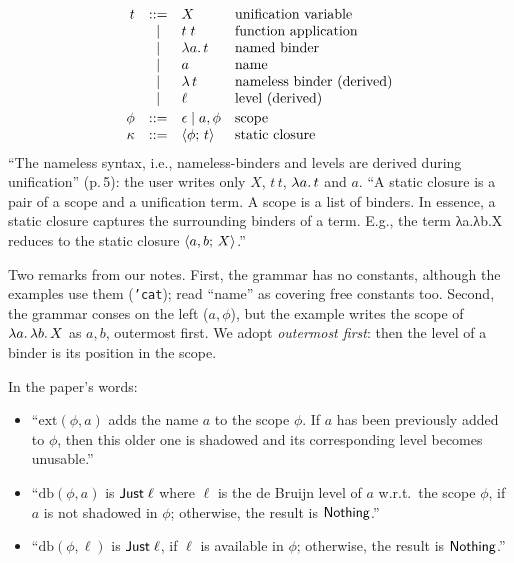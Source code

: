 \begin{definition}\label{def:lkanren-closure}
\[
\begin{array}{rcll}
t & ::= & X & \text{unification variable}\\
  & \mid & t\;t & \text{function application}\\
  & \mid & \lambda a.\,t & \text{named binder}\\
  & \mid & a & \text{name}\\
  & \mid & \lambda\,t & \text{nameless binder (derived)}\\
  & \mid & \ell & \text{level (derived)}\\[2pt]
\phi & ::= & \epsilon \mid a,\phi & \text{scope}\\
\kappa & ::= & \langle \phi;\,t\rangle & \text{static closure}
\end{array}
\]
\enquote{The nameless syntax, i.e., nameless-binders and levels are derived during unification}
(p.\,5): the user writes only $X$, $t\,t$, $\lambda a.\,t$ and $a$. \enquote{A static closure is a pair
of a scope and a unification term. A scope is a list of binders. In essence, a static closure
captures the surrounding binders of a term. E.g., the term λa.λb.X reduces to the static closure
$\langle a,b;\,X\rangle$.}
\end{definition}

Two remarks from our notes. First, the grammar has no constants, although the examples use them
(\texttt{'cat}); read \enquote{name} as covering free constants too. Second, the grammar conses on
the left ($a,\phi$), but the example writes the scope of $\lambda a.\,\lambda b.\,X$ as $a,b$, outermost
first. We adopt \emph{outermost first}: then the level of a binder is its position in the scope.

\begin{definition}\label{def:lkanren-extdb}
In the paper's words:
\begin{itemize}
  \item \enquote{$\mathrm{ext}(\phi,a)$ adds the name $a$ to the scope $\phi$. If $a$ has been
    previously added to $\phi$, then this older one is shadowed and its corresponding level becomes
    unusable.}
  \item \enquote{$\mathrm{db}(\phi,a)$ is $\mathsf{Just}\;\ell$ where $\ell$ is the de Bruijn level of $a$
    w.r.t.\ the scope $\phi$, if $a$ is not shadowed in $\phi$; otherwise, the result is
    $\mathsf{Nothing}$.}
  \item \enquote{$\mathrm{db}(\phi,\ell)$ is $\mathsf{Just}\;\ell$, if $\ell$ is available in $\phi$;
    otherwise, the result is $\mathsf{Nothing}$.}
\end{itemize}
\end{definition}

